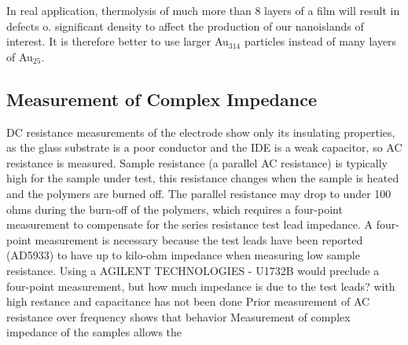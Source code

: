 \documentclass[12pt,oneside,english]{article}
\begin{document}
	In real application, thermolysis of much more than 8 layers of a film will result in defects o.
	significant density to affect the production of our nanoislands of interest.
	It is therefore better to use larger Au$_{314}$ particles instead of many layers of Au$_{25}$.

	\subsection{Measurement of Complex Impedance}
	DC resistance measurements of the electrode show only its insulating properties, as the glass substrate is a poor conductor and the IDE is a weak capacitor, so AC resistance is measured.
	Sample resistance (a parallel AC resistance) is typically high for the sample under test, this resistance changes when the sample is heated and the polymers are burned off.  
	The parallel resistance may drop to under 100 ohms during the burn-off of the polymers, which requires a four-point measurement to compensate for the series resistance test lead impedance.
	A four-point measurement is necessary because the test leads have been reported (AD5933) to have up to kilo-ohm impedance when measuring low sample resistance.
	Using a AGILENT TECHNOLOGIES - U1732B would preclude a four-point measurement, but how much impedance is due to the test leads?
	with high restance and capacitance has not been done
	Prior measurement of AC resistance over frequency shows that behavior
	Measurement of complex impedance of the samples allows the




\clearpage


\end{document}

